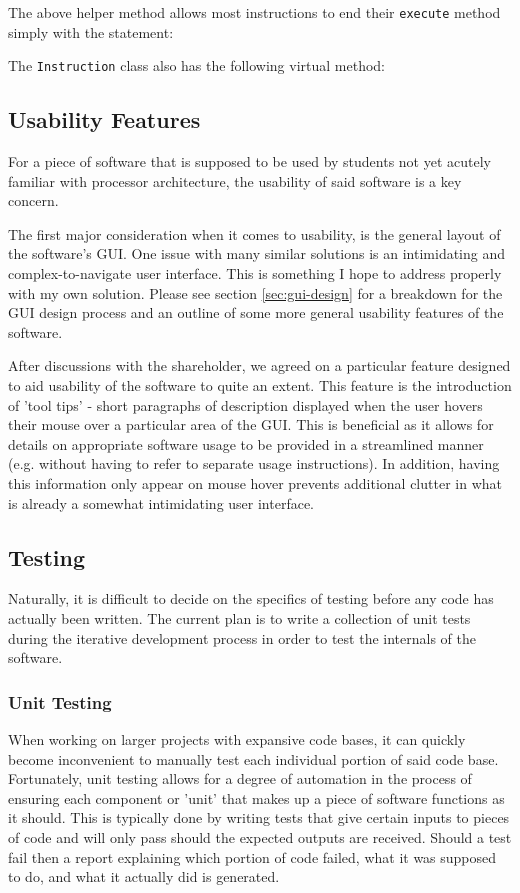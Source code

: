     The above helper method allows most instructions to end their \texttt{execute} method simply with the statement: 

    The \texttt{Instruction} class also has the following virtual method: 

\subsection{Usability Features}
    For a piece of software that is supposed to be used by students not yet acutely familiar with processor architecture, the usability of said software is a key concern.

    The first major consideration when it comes to usability, is the general layout of the software's GUI. One issue with many similar solutions is an intimidating and complex-to-navigate user interface. This is something I hope to address properly with my own solution. Please see section \ref{sec:gui-design} for a breakdown for the GUI design process and an outline of some more general usability features of the software.

    After discussions with the shareholder, we agreed on a particular feature designed to aid usability of the software to quite an extent. This feature is the introduction of 'tool tips' - short paragraphs of description displayed when the user hovers their mouse over a particular area of the GUI. This is beneficial as it allows for details on appropriate software usage to be provided in a streamlined manner (e.g. without having to refer to separate usage instructions). In addition, having this information only appear on mouse hover prevents additional clutter in what is already a somewhat intimidating user interface.

\subsection{Testing}
    Naturally, it is difficult to decide on the specifics of testing before any code has actually been written. The current plan is to write a collection of unit tests during the iterative development process in order to test the internals of the software.

    \subsubsection{Unit Testing}
        When working on larger projects with expansive code bases, it can quickly become inconvenient to manually test each individual portion of said code base. Fortunately, unit testing allows for a degree of automation in the process of ensuring each component or 'unit' that makes up a piece of software functions as it should. This is typically done by writing tests that give certain inputs to pieces of code and will only pass should the expected outputs are received. Should a test fail then a report explaining which portion of code failed, what it was supposed to do, and what it actually did is generated.

